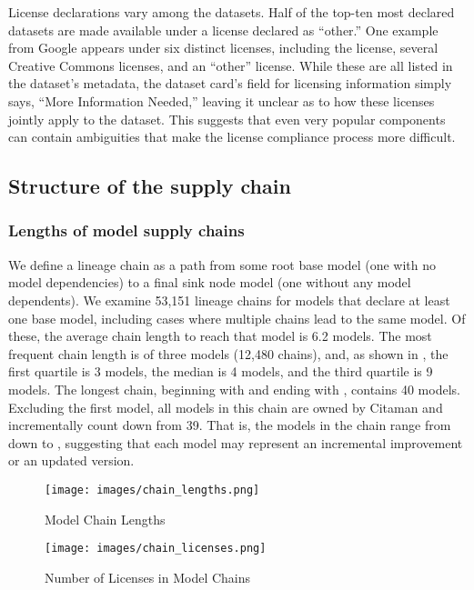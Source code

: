 License declarations vary among the datasets. Half of the top-ten most declared datasets are made available under a license declared as ``other.'' One example from Google appears under six distinct licenses, including the  license, several Creative Commons licenses, and an ``other'' license. While these are all listed in the dataset's metadata, the dataset card's field for licensing information simply says, ``More Information Needed,'' leaving it unclear as to how these licenses jointly apply to the dataset. This suggests that even very popular components can contain ambiguities that make the license compliance process more difficult. %



\subsection{Structure of the supply chain}

\subsubsection{Lengths of model supply chains}

We define a lineage chain as a path from some root base model (\ie one with no model dependencies) to a final sink node model (\ie one without any model dependents).  We examine 53,151 lineage chains for models that declare at least one base model, including cases where multiple chains lead to the same model. Of these, the average chain length to reach that model is 6.2 models. The most frequent chain length is of three models (12,480 chains), and, as shown in , the first quartile is 3 models, the median is 4 models, and the third quartile is 9 models. %
The longest chain, beginning with  and ending with , contains 40 models.  Excluding the first model, all models in this chain are owned by Citaman and incrementally count down from 39. 
That is, the models in the chain range from  down to , suggesting that each model may represent an incremental improvement or an updated version.  %

\begin{figure}[t]
\centering
\begin{minipage}[c]{0.45\linewidth}
\texttt{[image: images/chain\_lengths.png]}
\caption{Model Chain Lengths}
\label{fig:chain_lengths}
\end{minipage}
\hfill
\centering
\begin{minipage}[c]{0.45\linewidth}
\texttt{[image: images/chain\_licenses.png]}
\caption{Number of Licenses in Model Chains}
\label{fig:chain_licenses}
\end{minipage}
\end{figure}


